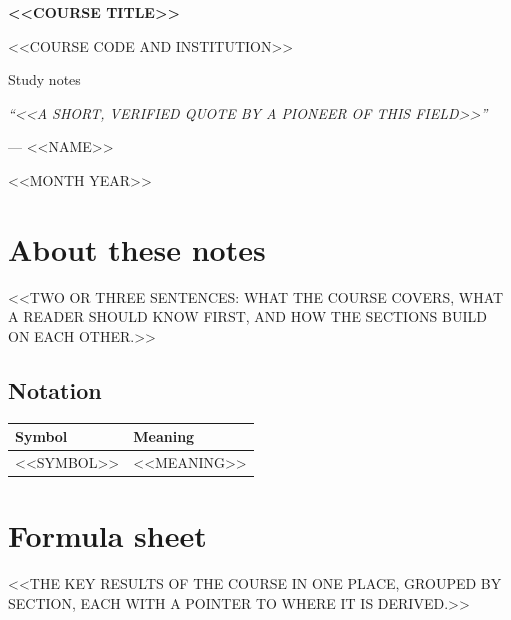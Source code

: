 \documentclass[11pt]{article}
\theoremstyle{definition}
\theoremstyle{plain}
\theoremstyle{remark}
\begin{document}
\begin{titlepage}
  \raggedright
  \vspace*{2.2cm}
  {\Huge\bfseries <<COURSE TITLE>>\par}
  \vspace{0.8em}
  {\Large <<COURSE CODE AND INSTITUTION>>\par}
  \vspace{0.4em}
  {\large Study notes\par}
  \vfill
  \begin{flushright}
    \begin{minipage}{0.46\textwidth}
      \raggedleft{}
      {\itshape ``<<A SHORT, VERIFIED QUOTE BY A PIONEER OF THIS FIELD>>''\par}
      \vspace{0.5em}
      --- <<NAME>>\par
    \end{minipage}
  \end{flushright}
  \vfill
  {\small <<MONTH YEAR>>\par}
\end{titlepage}

\setcounter{tocdepth}{1}%
\tableofcontents
\clearpage

\section*{About these notes}
<<TWO OR THREE SENTENCES: WHAT THE COURSE COVERS, WHAT A READER SHOULD KNOW FIRST, AND HOW THE SECTIONS BUILD ON EACH OTHER.>>

\subsection*{Notation}
\begin{longtable}{@{}p{}p{}@{}}
\toprule
Symbol & Meaning \\
\midrule
<<SYMBOL>> & <<MEANING>> \\
\bottomrule
\end{longtable}
\addtocounter{table}{-1}%
\clearpage



\appendix
\section{Formula sheet}
<<THE KEY RESULTS OF THE COURSE IN ONE PLACE, GROUPED BY SECTION, EACH WITH A POINTER TO WHERE IT IS DERIVED.>>
\end{document}

